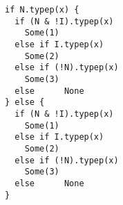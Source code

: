 \begin{lstlisting}[style=reclojureScala]
if N.typep(x) {
  if (N & !I).typep(x)
    Some(1)
  else if I.typep(x)
    Some(2)
  else if (!N).typep(x)
    Some(3)
  else      None
} else {
  if (N & !I).typep(x)
    Some(1)
  else if I.typep(x)
    Some(2)
  else if (!N).typep(x)
    Some(3)
  else      None
}
\end{lstlisting}
